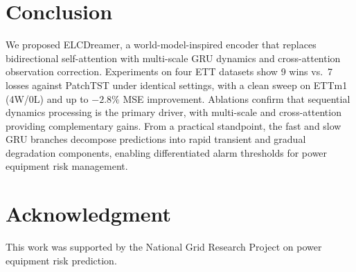 \documentclass[conference]{IEEEtran}
\begin{document}
\section{Conclusion}

We proposed ELCDreamer, a world-model-inspired encoder that replaces bidirectional self-attention with multi-scale GRU dynamics and cross-attention observation correction. Experiments on four ETT datasets show 9 wins vs.\ 7 losses against PatchTST under identical settings, with a clean sweep on ETTm1 (4W/0L) and up to $-2.8\%$ MSE improvement. Ablations confirm that sequential dynamics processing is the primary driver, with multi-scale and cross-attention providing complementary gains. From a practical standpoint, the fast and slow GRU branches decompose predictions into rapid transient and gradual degradation components, enabling differentiated alarm thresholds for power equipment risk management.

\section*{Acknowledgment}

This work was supported by the National Grid Research Project on power equipment risk prediction.
\end{document}
